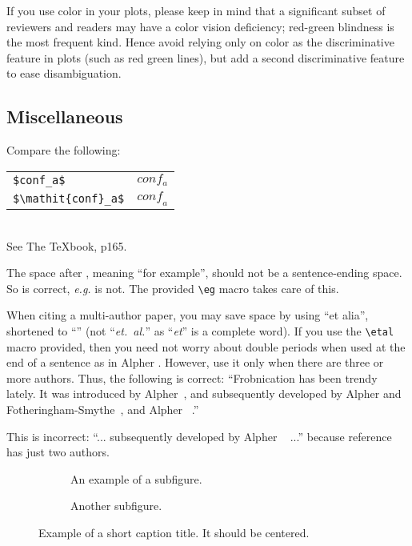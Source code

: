 If you use color in your plots, please keep in mind that a significant subset of reviewers and readers may have a color vision deficiency; red-green blindness is the most frequent kind.
Hence avoid relying only on color as the discriminative feature in plots (such as red \vs green lines), but add a second discriminative feature to ease disambiguation.

\subsection{Miscellaneous}

\noindent
Compare the following:\\
\begin{tabular}{ll}
 \verb'$conf_a$' &  $conf_a$ \\
 \verb'$\mathit{conf}_a$' & $\mathit{conf}_a$
\end{tabular}\\
See The \TeX book, p165.

The space after \eg, meaning ``for example'', should not be a sentence-ending space.
So \eg is correct, {\em e.g.} is not.
The provided \verb'\eg' macro takes care of this.

When citing a multi-author paper, you may save space by using ``et alia'', shortened to ``\etal'' (not ``{\em et.\ al.}'' as ``{\em et}'' is a complete word).
If you use the \verb'\etal' macro provided, then you need not worry about double periods when used at the end of a sentence as in Alpher \etal.
However, use it only when there are three or more authors.
Thus, the following is correct:
   ``Frobnication has been trendy lately.
   It was introduced by Alpher~\autocite{Alpher02}, and subsequently developed by
   Alpher and Fotheringham-Smythe~\autocite{Alpher03}, and Alpher \etal~\autocite{Alpher04}.''

This is incorrect: ``... subsequently developed by Alpher \etal~\autocite{Alpher03} ...'' because reference~\autocite{Alpher03} has just two authors.

\begin{figure*}
  \centering
  \begin{subfigure}{0.68\linewidth}
    \fbox{\rule{0pt}{2in} \rule{.9\linewidth}{0pt}}
    \caption{An example of a subfigure.}
    \label{fig:short-a}
  \end{subfigure}
  \hfill
  \begin{subfigure}{0.28\linewidth}
    \fbox{\rule{0pt}{2in} \rule{.9\linewidth}{0pt}}
    \caption{Another subfigure.}
    \label{fig:short-b}
  \end{subfigure}
  \caption{Example of a short caption title. It should be centered.}
  \label{fig:short}
\end{figure*}

